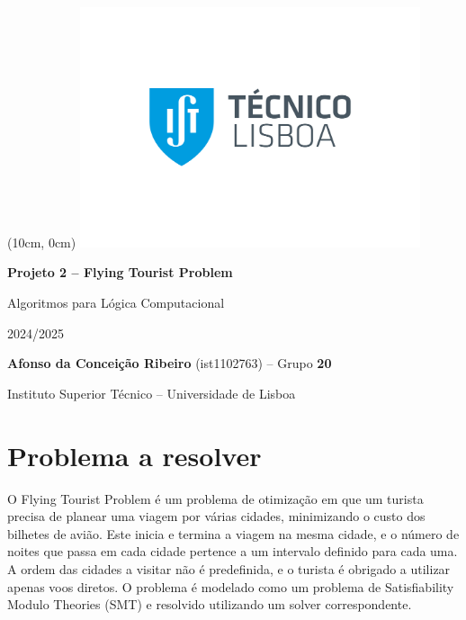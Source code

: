 \documentclass[12pt,a4paper]{article}
\newcommand{\reporttitle}{Projeto 2 -- Flying Tourist Problem}
\newcommand{\authorname}{Afonso da Conceição Ribeiro}
\newcommand{\authorid}{ist1102763}
\newcommand{\authorgroup}{20}
\newcommand{\reportauthor}{\textbf{\authorname} (\authorid) -- Grupo \textbf{\authorgroup}}
\newcommand{\istul}{Instituto Superior Técnico -- Universidade de Lisboa}
\newcommand{\reportcourse}{Algoritmos para Lógica Computacional}
\newcommand{\reportyear}{2024/2025}
\begin{document}
    \begin{titlepage}

        \begin{textblock*}{0cm}(10cm, 0cm)
            \includegraphics[width=10cm]{Logo IST.jpg}
        \end{textblock*}

        \centering
        \vspace*{5cm}
        {\Huge \textbf{\reporttitle} \par}

        \vspace{0.5cm}
        {\LARGE \reportcourse \par}

        \vspace{0.5cm}
        {\large \reportyear \par}

        \vspace{2cm}
        {\large \reportauthor \par}
        
        \vspace{0.25cm}
        {\large \istul \par}

        \vfill
        \renewcommand{\contentsname}{Índice}
        \tableofcontents

        \thispagestyle{empty}
        \clearpage

    \end{titlepage}


    \setcounter{page}{2}
    \setlength{\parskip}{0em}


    \section{Problema a resolver}
        O Flying Tourist Problem é um problema de otimização em que um turista precisa de planear uma viagem por várias cidades, minimizando o custo dos bilhetes de avião. Este inicia e termina a viagem na mesma cidade, e o número de noites que passa em cada cidade pertence a um intervalo definido para cada uma. A ordem das cidades a visitar não é predefinida, e o turista é obrigado a utilizar apenas voos diretos. O problema é modelado como um problema de Satisfiability Modulo Theories (SMT) e resolvido utilizando um solver correspondente.
\end{document}
